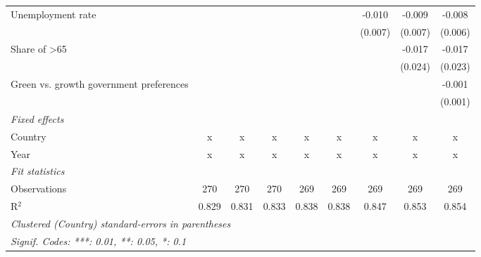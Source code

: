 \begin{table}[htbp]
\begin{tabular}{lcccccccc}
      Unemployment rate                                        &         &         &         &         &         & -0.010  & -0.009  & -0.008\\   
                                                               &         &         &         &         &         & (0.007) & (0.007) & (0.006)\\   
      Share of >65                                             &         &         &         &         &         &         & -0.017  & -0.017\\   
                                                               &         &         &         &         &         &         & (0.024) & (0.023)\\   
      Green vs. growth government preferences                  &         &         &         &         &         &         &         & -0.001\\   
                                                               &         &         &         &         &         &         &         & (0.001)\\   
      \emph{Fixed effects}\\
      Country                                                  & x       & x       & x       & x       & x       & x       & x       & x\\  
      Year                                                     & x       & x       & x       & x       & x       & x       & x       & x\\  
      \midrule \emph{Fit statistics}\\
      Observations                                             & 270     & 270     & 270     & 269     & 269     & 269     & 269     & 269\\  
      R$^2$                                                    & 0.829   & 0.831   & 0.833   & 0.838   & 0.838   & 0.847   & 0.853   & 0.854\\  
      \midrule
      \multicolumn{9}{l}{\emph{Clustered (Country) standard-errors in parentheses}}\\
      \multicolumn{9}{l}{\emph{Signif. Codes: ***: 0.01, **: 0.05, *: 0.1}}\\
   \end{tabular}
\end{table}


